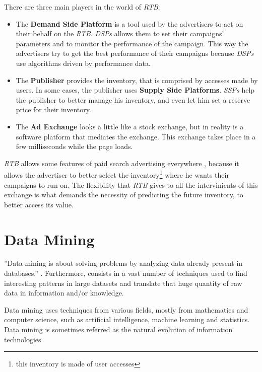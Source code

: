 There are three main players in the world of \emph{RTB}:
\begin{itemize}
\item The \textbf{Demand Side Platform} is a tool used by the advertisers to act on their behalf on the \emph{RTB}. \emph{DSPs} allows them to set
their campaigns' parameters and to monitor the performance of the campaign. This way the advertisers try to get the best performance of their campaigns because 
\emph{DSPs} use algorithms driven by performance data.\cite{Gern201230}
\item The \textbf{Publisher} provides the inventory, that is comprised by accesses made by users. In some cases, the publisher uses \textbf{Supply Side Platforms}.
\emph{SSPs} help the publisher to better manage his inventory, and even let him set a reserve price for their inventory.\cite{Yuan:2013:RBO:2501040.2501980}
\item The \textbf{Ad Exchange} looks a little like a stock exchange, but in reality is a software platform that mediates the exchange. This exchange takes place in
a few milliseconds while the page loads.
\end{itemize}

\emph{RTB} allows some features of paid search advertising everywhere \cite{Gern201230}, because it allows the advertiser to better select
the inventory\footnote{ this inventory is made of user accesses} where he wants their campaigns to run on.
The flexibility that \emph{RTB} gives to all the intervinients of this exchange is what demands the necessity of predicting the future inventory, to
better access its value.



\section{Data Mining}\label{sec:datamining}
''Data mining is about solving problems by analyzing data already present in databases.''\cite[p. 5]{Witten:2005:DMP:1205860}
. Furthermore, consists in a vast number of techniques used to find interesting patterns in large datasets and translate
that huge quantity of raw data in information and/or knowledge. 

Data mining uses techniques from various fields, mostly from mathematics and computer science,
such as artificial intelligence, machine learning and statistics.
Data mining is sometimes referred as the natural evolution of information technologies \cite[p. 1]{HanKam06}

